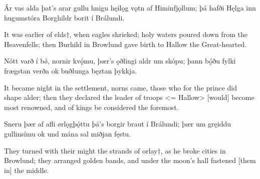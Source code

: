 \bookStart

Ár vas alda \hld þat’s arar gullu
hnigu hęilǫg vǫtn \hld af Himinfjǫllum;
þá hafði Hęlga \hld inn hugumstóra
Borghildr borit \hld í Brálundi.

It was earlier of elds†, when eagles shrieked; holy waters poured down from the Heavenfells; then Burhild in Browlund gave birth to Hallow the Great-hearted.

Nótt varð í bǿ, \hld nornir kvǫ́mu,
þær’s ǫðlingi \hld aldr um skópu;
þann bǫ́ðu fylki \hld frægstan verða
ok buðlunga \hld bęztan þykkja.

It became night in the settlement, norns came, those who for the prince did shape alder; then they declared the leader of troops <= Hallow> [would] become most renowned, and of kings be considered the foremost.

Sneru þær af afli \hld ørlǫgþǫ́ttu
þá’s borgir braut \hld í Brálundi;
þær um gręiddu \hld gullinsímu
ok und mána sal \hld miðjan fęstu.

They turned with their might the strands of orlay†, as he broke cities in Browlund; they arranged golden bands, and under the moon's hall fastened [them in] the middle. 
